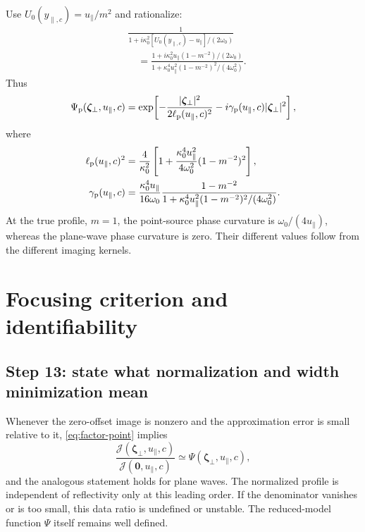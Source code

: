 \documentclass[11pt]{article}
\newcommand{\bzeta}{\boldsymbol{\zeta}}
\begin{document}
Use $U_0(y_{\parallel,c})=u_\parallel/m^2$ and rationalize:
\begin{align}
&\frac{1}{1+i\kappa_0^2[U_0(y_{\parallel,c})-u_\parallel]/(2\omega_0)}
\nonumber\\
&\quad=
\frac{1+i\kappa_0^2u_\parallel(1-m^{-2})/(2\omega_0)}
{1+\kappa_0^4u_\parallel^2(1-m^{-2})^2/(4\omega_0^2)}.
\end{align}
Thus
\begin{equation}
\Psi_{\rm p}(\bzeta_\perp,u_\parallel,c)
=\exp\!\left[-\frac{|\bzeta_\perp|^2}{2\ell_{\rm p}(u_\parallel,c)^2}
-i\gamma_{\rm p}(u_\parallel,c)|\bzeta_\perp|^2\right],
\end{equation}
where
\begin{align}
\ell_{\rm p}(u_\parallel,c)^2
&=\frac{4}{\kappa_0^2}
\left[1+\frac{\kappa_0^4u_\parallel^2}{4\omega_0^2}
(1-m^{-2})^2\right],
\label{eq:ell-plane}\\
\gamma_{\rm p}(u_\parallel,c)
&=\frac{\kappa_0^4u_\parallel}{16\omega_0}
\frac{1-m^{-2}}
{1+\kappa_0^4u_\parallel^2(1-m^{-2})^2/(4\omega_0^2)}.
\label{eq:gamma-plane}
\end{align}
At the true profile, $m=1$, the point-source phase curvature is
$\omega_0/(4u_\parallel)$, whereas the plane-wave phase curvature is
zero. Their different values follow from the different imaging kernels.

\section{Focusing criterion and identifiability}

\subsection{Step 13: state what normalization and width minimization mean}

Whenever the zero-offset image is nonzero and the approximation error is
small relative to it, \eqref{eq:factor-point} implies
\begin{equation}
\frac{\mathcal J(\bzeta_\perp,u_\parallel,c)}
{\mathcal J(\mathbf0,u_\parallel,c)}
\simeq\Psi(\bzeta_\perp,u_\parallel,c),
\end{equation}
and the analogous statement holds for plane waves. The normalized
profile is independent of reflectivity only at this leading order.
If the denominator vanishes or is too small, this data ratio is
undefined or unstable. The reduced-model function $\Psi$ itself
remains well defined.
\end{document}
